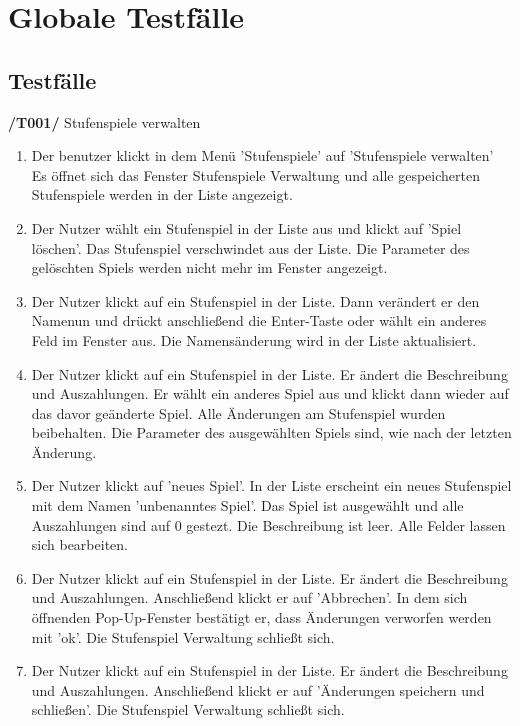 
\section{Globale Testfälle}

\subsection{Testfälle}

\textbf{/T001/} Stufenspiele verwalten
\begin{enumerate}

\item {}
{Der benutzer klickt in dem Menü 'Stufenspiele' auf 'Stufenspiele verwalten'}
{Es öffnet sich das Fenster Stufenspiele Verwaltung und alle gespeicherten Stufenspiele werden in der Liste angezeigt.}

\item {}
{Der Nutzer wählt ein Stufenspiel in der Liste aus und klickt auf 'Spiel löschen'.}
{Das Stufenspiel verschwindet aus der Liste. Die Parameter des gelöschten Spiels werden nicht mehr im Fenster angezeigt.}

\item {}
{Der Nutzer klickt auf ein Stufenspiel in der Liste. Dann verändert er den Namenun und drückt anschließend die Enter-Taste oder wählt ein anderes Feld im Fenster aus.}
{Die Namensänderung wird in der Liste aktualisiert. }

\item {}
{Der Nutzer klickt auf ein Stufenspiel in der Liste. Er ändert die Beschreibung und Auszahlungen. Er wählt ein anderes Spiel aus und klickt dann wieder auf das davor geänderte Spiel.}
{Alle Änderungen am Stufenspiel wurden beibehalten. Die Parameter des ausgewählten Spiels sind, wie nach der letzten Änderung.}

\item {}
{Der Nutzer klickt auf 'neues Spiel'.}
{In der Liste erscheint ein neues Stufenspiel mit dem Namen 'unbenanntes Spiel'. Das Spiel ist ausgewählt und alle Auszahlungen sind auf 0 gestezt. Die Beschreibung ist leer. Alle Felder lassen sich bearbeiten.}

\item {}
{Der Nutzer klickt auf ein Stufenspiel in der Liste. Er ändert die Beschreibung und Auszahlungen. Anschließend klickt er auf 'Abbrechen'. In dem sich öffnenden Pop-Up-Fenster bestätigt er, dass Änderungen verworfen werden mit 'ok'.}
{Die Stufenspiel Verwaltung schließt sich.}

\item {}
{Der Nutzer klickt auf ein Stufenspiel in der Liste. Er ändert die Beschreibung und Auszahlungen. Anschließend klickt er auf 'Änderungen speichern und schließen'.}
{Die Stufenspiel Verwaltung schließt sich.}


\end{enumerate}

